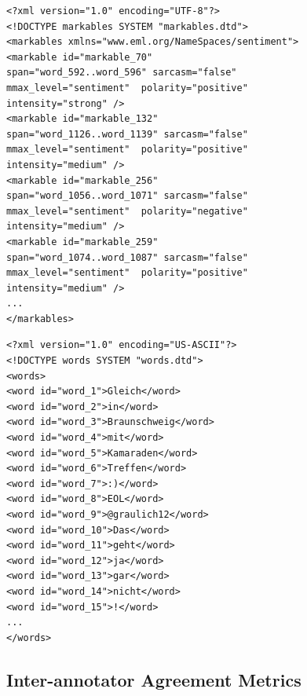 \begin{minipage}[t]{\textwidth}
  \begin{minipage}[t]{0.45\textwidth}
    \lstset{language=XML}
    \begin{lstlisting}
<?xml version="1.0" encoding="UTF-8"?>
<!DOCTYPE markables SYSTEM "markables.dtd">
<markables xmlns="www.eml.org/NameSpaces/sentiment">
<markable id="markable_70"
span="word_592..word_596" sarcasm="false"
mmax_level="sentiment"  polarity="positive"
intensity="strong" />
<markable id="markable_132"
span="word_1126..word_1139" sarcasm="false"
mmax_level="sentiment"  polarity="positive"
intensity="medium" />
<markable id="markable_256"
span="word_1056..word_1071" sarcasm="false"
mmax_level="sentiment"  polarity="negative"
intensity="medium" />
<markable id="markable_259"
span="word_1074..word_1087" sarcasm="false"
mmax_level="sentiment"  polarity="positive"
intensity="medium" />
...
</markables>
    \end{lstlisting}%
  \end{minipage}\hfill%
  \begin{minipage}[t]{0.45\textwidth}%
    \lstset{language=XML}
    \begin{lstlisting}[basicstyle=\tiny]
<?xml version="1.0" encoding="US-ASCII"?>
<!DOCTYPE words SYSTEM "words.dtd">
<words>
<word id="word_1">Gleich</word>
<word id="word_2">in</word>
<word id="word_3">Braunschweig</word>
<word id="word_4">mit</word>
<word id="word_5">Kamaraden</word>
<word id="word_6">Treffen</word>
<word id="word_7">:)</word>
<word id="word_8">EOL</word>
<word id="word_9">@graulich12</word>
<word id="word_10">Das</word>
<word id="word_11">geht</word>
<word id="word_12">ja</word>
<word id="word_13">gar</word>
<word id="word_14">nicht</word>
<word id="word_15">!</word>
...
</words>
    \end{lstlisting}%
  \end{minipage}
\end{minipage}

\subsection{Inter-annotator Agreement Metrics}\label{subsec:snt:iaa}

